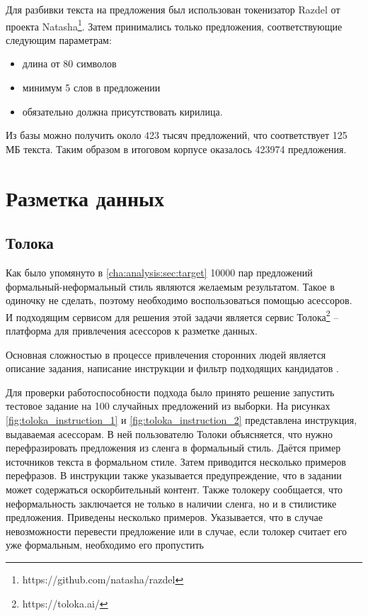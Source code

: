Для разбивки текста на предложения был использован токенизатор Razdel от проекта Natasha\footnote{https://github.com/natasha/razdel}.
Затем принимались только предложения, соответствующие следующим параметрам:
\begin{itemize}
    \item длина от 80 символов
    \item минимум 5 слов в предложении
    \item обязательно должна присутствовать кирилица.
\end{itemize}
Из базы можно получить около 423 тысяч предложений, что соответствует 125 МБ текста.
Таким образом в итоговом корпусе оказалось 423974 предложения.


\section{Разметка данных}
\subsection{Толока}
Как было упомянуто в \ref{cha:analysis:sec:target} 10000 пар предложений формальный-неформальный стиль являются желаемым результатом. Такое в одиночку не сделать, поэтому необходимо воспользоваться помощью асессоров. И подходящим сервисом для решения этой задачи является сервис Толока\footnote{https://toloka.ai/} -- платформа для привлечения асессоров к разметке данных.

Основная сложностью в процессе привлечения сторонних людей является описание задания, написание инструкции и фильтр подходящих кандидатов \cite{dementieva2021crowdsourcing}.

Для проверки работоспособности подхода было принято решение запустить тестовое задание на 100 случайных предложений из выборки.
На рисунках \ref{fig:toloka_instruction_1} и \ref{fig:toloka_instruction_2} представлена инструкция, выдаваемая асессорам. 
В ней пользователю Толоки объясняется, что нужно перефразировать предложения из сленга в формальный стиль.
Даётся пример источников текста в формальном стиле.
Затем приводится несколько примеров перефразов.
В инструкции также указывается предупреждение, что в задании может содержаться оскорбительный контент.
Также толокеру сообщается, что неформальность заключается не только в наличии сленга, но и в стилистике предложения. Приведены несколько примеров.
Указывается, что в случае невозможности перевести предложение или в случае, если толокер считает его уже формальным, необходимо его пропустить

